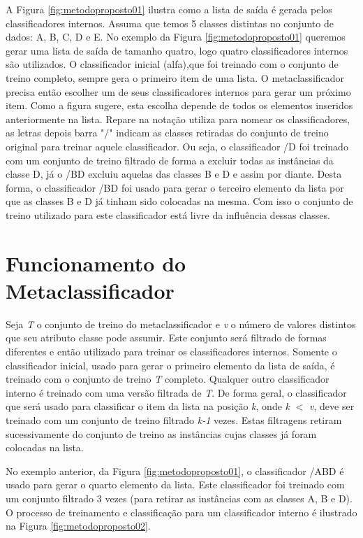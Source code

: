 A Figura \ref{fig:metodoproposto01} ilustra como a lista de saída é gerada pelos classificadores internos.
Assuma que temos 5 classes distintas no conjunto de dados: A, B, C, D e E. 
No exemplo da Figura \ref{fig:metodoproposto01} queremos gerar uma lista de saída de tamanho quatro, logo quatro classificadores internos são utilizados. 
O classificador inicial (alfa),que foi treinado com o conjunto de treino completo, sempre gera o primeiro item de uma lista. 
O metaclassificador precisa então escolher um de seus classificadores internos para gerar um próximo item. 
Como a figura sugere, esta escolha depende de todos os elementos inseridos anteriormente na lista.
Repare na notação utiliza para nomear os classificadores, as letras depois barra "/" indicam as classes retiradas do conjunto de treino original para treinar aquele classificador.
Ou seja, o classificador /D foi treinado com um conjunto de treino filtrado de forma a excluir todas as instâncias da classe D, já o /BD excluiu aquelas das classes B e D e assim por diante.
Desta forma, o classificador /BD foi usado para gerar o terceiro elemento da lista por que as classes B e D já tinham sido colocadas na mesma.
Com isso o conjunto de treino utilizado para este classificador está livre da influência dessas classes.

\section{Funcionamento do Metaclassificador}

Seja \textit{T} o conjunto de treino do metaclassificador e \textit{v} o número de valores distintos que seu atributo classe pode assumir. 
Este conjunto será filtrado de formas diferentes e então utilizado para treinar os classificadores internos. 
Somente o classificador inicial, usado para gerar o primeiro elemento da lista de saída, é treinado com o conjunto de treino \textit{T} completo. 
Qualquer outro classificador interno é treinado com uma versão filtrada de  \textit{T}. 
De forma geral, o classificador que será usado para classificar o item da lista na posição \textit{k}, onde \textit{k} $<$ \textit{v}, deve ser treinado com um conjunto de treino filtrado \textit{k-1} vezes. 
Estas filtragens retiram sucessivamente do conjunto de treino as instâncias cujas classes já foram colocadas na lista.

No exemplo anterior, da Figura \ref{fig:metodoproposto01}, o classificador /ABD é usado para gerar o quarto elemento da lista.
Este classificador foi treinado com um conjunto filtrado 3 vezes (para retirar as instâncias com as classes A, B e D).
O processo de treinamento e classificação para um classificador interno é ilustrado na Figura \ref{fig:metodoproposto02}.

